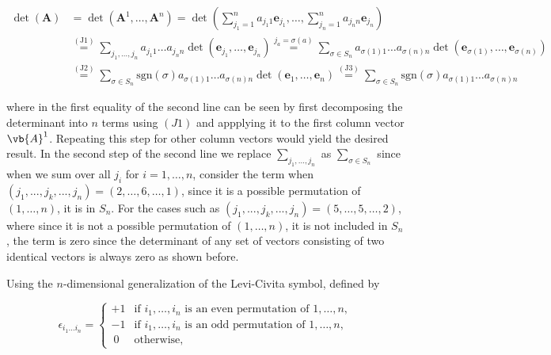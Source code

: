 \documentclass[a4paper,12pt]{report}
\begin{document}
\begin{equation} \label{detdef} 
\begin{aligned}
\det(\mathbf{A}) &= \det(\mathbf{A}^1, \ldots, \mathbf{A}^n) = \det \left( \sum_{j_1=1}^{n} a_{j_1 1} \mathbf{e}_{j_1}, \ldots, \sum_{j_n=1}^{n} a_{j_n n} \mathbf{e}_{j_n} \right) \\ &\overset{(\text{J1})}{=} \sum_{j_1, \ldots, j_n} a_{j_1 1} \ldots a_{j_n n} \det(\mathbf{e}_{j_1}, \ldots, \mathbf{e}_{j_n}) \overset{j_a = \sigma(a)}{=} \sum_{\sigma \in S_n} a_{\sigma(1) 1} \ldots a_{\sigma(n) n} \det(\mathbf{e}_{\sigma(1)}, \ldots, \mathbf{e}_{\sigma(n)}) \\ &\overset{(\text{J2})}{=} \sum_{\sigma \in S_n} \text{sgn}(\sigma) a_{\sigma(1) 1} \ldots a_{\sigma(n) n} \det(\mathbf{e}_1, \ldots, \mathbf{e}_n) \overset{(\text{J3})}{=} \sum_{\sigma \in S_n} \text{sgn}(\sigma) a_{\sigma(1) 1} \ldots a_{\sigma(n) n}
\end{aligned}
\end{equation}

where in the first equality of the second line can be seen by first decomposing the determinant into \(n\) terms using \((J1)\) and appplying it to the first column vector \(\vb{A} ^{1} \). Repeating this step for other column vectors would yield the desired result. In the second step of the second line we replace \(\sum_{j_1 ,..., j_{n} }^{} \) as \(\sum_{\sigma \in S_{n} }^{} \) since when we sum over all \(j_{i}\) for \(i = 1,\ldots ,n\), consider the term when \((j_1 , ..., j_{k}, ..., j_{n}) = (2,\ldots ,6,\ldots ,1)\), since it is a possible permutation of \((1,\ldots ,n)\), it is in \(S_{n} \). For the cases such as \((j_1 , ..., j_{k}, ..., j_{n}) = (5,\ldots ,5,\ldots ,2)\), where since it is not a possible permutation of \((1,\ldots ,n)\), it is not included in \(S_{n} \), the term is zero since the determinant of any set of vectors consisting of two identical vectors is always zero as shown before.

Using the \(n\)-dimensional generalization of the Levi-Civita symbol, defined by 

\begin{equation}
    \epsilon_{i_1 \ldots  i_n} = 
    \begin{cases} 
    +1 & \text{if } i_1, \ldots, i_n \text{ is an even permutation of } 1, \ldots, n, \\ 
    -1 & \text{if } i_1, \ldots, i_n \text{ is an odd permutation of } 1, \ldots, n, \\ 
    ~0 & \text{otherwise}, 
    \end{cases}
\end{equation}
    
\end{document}
